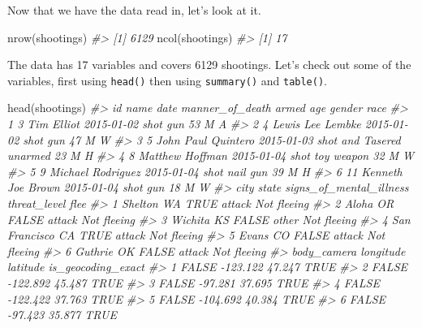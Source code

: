 \documentclass[
  12pt,
]{book}
\newenvironment{Shaded}{\begin{snugshade}}{\end{snugshade}}
\newcommand{\CommentTok}[1]{\textcolor[rgb]{0.37,0.37,0.37}{\textit{#1}}}
\newcommand{\FunctionTok}[1]{\textcolor[rgb]{0,0,0}{#1}}
\newcommand{\NormalTok}[1]{#1}
\begin{document}
Now that we have the data read in, let's look at it.

\begin{Shaded}
\begin{Highlighting}[]
\FunctionTok{nrow}\NormalTok{(shootings)}
\CommentTok{\#\textgreater{} [1] 6129}
\FunctionTok{ncol}\NormalTok{(shootings)}
\CommentTok{\#\textgreater{} [1] 17}
\end{Highlighting}
\end{Shaded}

The data has 17 variables and covers 6129 shootings. Let's check out some of the variables, first using \texttt{head()} then using \texttt{summary()} and \texttt{table()}.

\begin{Shaded}
\begin{Highlighting}[]
\FunctionTok{head}\NormalTok{(shootings)}
\CommentTok{\#\textgreater{}   id               name       date  manner\_of\_death      armed age gender race}
\CommentTok{\#\textgreater{} 1  3         Tim Elliot 2015{-}01{-}02             shot        gun  53      M    A}
\CommentTok{\#\textgreater{} 2  4   Lewis Lee Lembke 2015{-}01{-}02             shot        gun  47      M    W}
\CommentTok{\#\textgreater{} 3  5 John Paul Quintero 2015{-}01{-}03 shot and Tasered    unarmed  23      M    H}
\CommentTok{\#\textgreater{} 4  8    Matthew Hoffman 2015{-}01{-}04             shot toy weapon  32      M    W}
\CommentTok{\#\textgreater{} 5  9  Michael Rodriguez 2015{-}01{-}04             shot   nail gun  39      M    H}
\CommentTok{\#\textgreater{} 6 11  Kenneth Joe Brown 2015{-}01{-}04             shot        gun  18      M    W}
\CommentTok{\#\textgreater{}            city state signs\_of\_mental\_illness threat\_level        flee}
\CommentTok{\#\textgreater{} 1       Shelton    WA                    TRUE       attack Not fleeing}
\CommentTok{\#\textgreater{} 2         Aloha    OR                   FALSE       attack Not fleeing}
\CommentTok{\#\textgreater{} 3       Wichita    KS                   FALSE        other Not fleeing}
\CommentTok{\#\textgreater{} 4 San Francisco    CA                    TRUE       attack Not fleeing}
\CommentTok{\#\textgreater{} 5         Evans    CO                   FALSE       attack Not fleeing}
\CommentTok{\#\textgreater{} 6       Guthrie    OK                   FALSE       attack Not fleeing}
\CommentTok{\#\textgreater{}   body\_camera longitude latitude is\_geocoding\_exact}
\CommentTok{\#\textgreater{} 1       FALSE  {-}123.122   47.247               TRUE}
\CommentTok{\#\textgreater{} 2       FALSE  {-}122.892   45.487               TRUE}
\CommentTok{\#\textgreater{} 3       FALSE   {-}97.281   37.695               TRUE}
\CommentTok{\#\textgreater{} 4       FALSE  {-}122.422   37.763               TRUE}
\CommentTok{\#\textgreater{} 5       FALSE  {-}104.692   40.384               TRUE}
\CommentTok{\#\textgreater{} 6       FALSE   {-}97.423   35.877               TRUE}
\end{Highlighting}
\end{Shaded}
\end{document}
